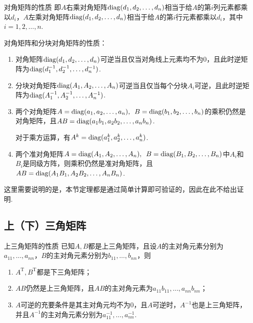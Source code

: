 \begin{theorem}{}{对角矩阵的性质}
    即$A$右乘对角矩阵$\operatorname{diag}(d_1,d_2,\ldots,d_n)$相当于给$A$的第$i$列元素都乘以$d_i$，$A$左乘对角矩阵$\operatorname{diag}(d_1,d_2,\ldots,d_n)$相当于给$A$的第$i$行元素都乘以$d_i$，其中 $i=1,2,\ldots,n$.
\end{theorem}

\begin{theorem}{}{}
    对角矩阵和分块对角矩阵的性质：
    \begin{enumerate}
        \item 对角矩阵$\operatorname{diag}(d_1,d_2,\ldots,d_n)$可逆当且仅当对角线上元素均不为0，且此时逆矩阵为$\operatorname{diag}(d_1^{-1},d_2^{-1},\ldots,d_n^{-1})$.

        \item 分块对角矩阵$\operatorname{diag}(A_1,A_2,\ldots,A_n)$可逆当且仅当每个分块$A_i$可逆，且此时逆矩阵为$\operatorname{diag}(A_1^{-1},A_2^{-1},\ldots,A_n^{-1})$.

        \item 两个对角矩阵$A=\operatorname{diag}(a_1,a_2,\ldots,a_n),\enspace B=\operatorname{diag}(b_1,b_2,\ldots,b_n)$的乘积仍然是对角矩阵，且$AB=\operatorname{diag}(a_1b_1,a_2b_2,\ldots,a_nb_n)$.

              对于乘方运算，有$A^k=\operatorname{diag}(a_1^k,a_2^k,\ldots,a_n^k)$.

        \item 两个准对角矩阵$A=\operatorname{diag}(A_1,A_2,\ldots,A_n),\enspace B=\operatorname{diag}(B_1,B_2,\ldots,B_n)$中$A_i$和$B_i$是同级方阵，则乘积仍然是准对角矩阵，且$AB=\operatorname{diag}(A_1B_1,A_2B_2,\ldots,A_nB_n)$.
    \end{enumerate}
\end{theorem}

这里需要说明的是，本节定理都是通过简单计算即可验证的，因此在此不给出证明.

\subsection{上（下）三角矩阵}

\begin{theorem}{}{上三角矩阵的性质}
    已知$A,B$都是上三角矩阵，且设$A$的主对角元素分别为$a_{11},\ldots,a_{nn}$，$B$的主对角元素分别为$b_{11},\ldots,b_{nn}$，则
    \begin{enumerate}
        \item $A^{\mathrm{T}}, B^\mathrm{T}$都是下三角矩阵；

        \item $AB$仍然是上三角矩阵，且$AB$的主对角元素为$a_{11}b_{11},\ldots,a_{nn}b_{nn}$；

        \item $A$可逆的充要条件是其主对角元均不为0，且$A$可逆时，$A^{-1}$也是上三角矩阵，并且$A^{-1}$的主对角元素分别为$a_{11}^{-1},\ldots,a_{nn}^{-1}$.
    \end{enumerate}
\end{theorem}

